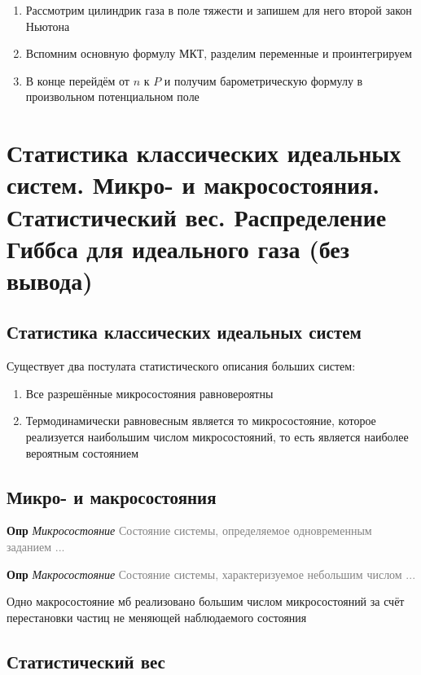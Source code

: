 \documentclass[a4paper, 14pt]{article}
\begin{document}
    \begin{enumerate}
        \item Рассмотрим цилиндрик газа в поле тяжести и запишем для него второй закон Ньютона
        \item Вспомним основную формулу МКТ, разделим переменные и проинтегрируем
        \item В конце перейдём от $n$ к $P$ и получим барометрическую формулу в произвольном потенциальном поле
    \end{enumerate}
    
    \section{Статистика классических идеальных систем.
    Микро- и макросостояния.
    Статистический вес.
    Распределение Гиббса для идеального газа (без вывода)}
    
    \subsection{Статистика классических идеальных систем}
    
    Существует два постулата статистического описания больших систем:
    
    \begin{enumerate}
        \item Все разрешённые микросостояния равновероятны
        \item Термодинамически равновесным является то микросостояние, которое реализуется наибольшим числом
        микросостояний, то есть является наиболее вероятным состоянием
    \end{enumerate}
    
    \subsection{Микро- и макросостояния}
    
    \textbf{Опр} \textit{Микросостояние} \textcolor{gray}{Состояние системы, определяемое одновременным заданием ...}
    
    \textbf{Опр} \textit{Макросостояние} \textcolor{gray}{Состояние системы, характеризуемое небольшим числом ...}
    
    Одно макросостояние мб реализовано большим числом микросостояний за счёт перестановки частиц не меняющей
    наблюдаемого состояния
    
    \subsection{Статистический вес}
    
\end{document}
